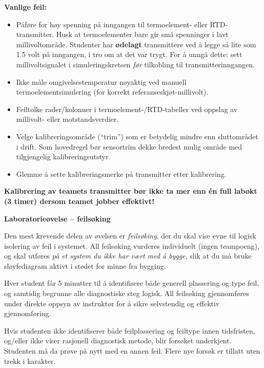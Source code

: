 \vskip 10pt

{\bf Vanlige feil:}

\begin{itemize}
\item{} Påføre for høy spenning på inngangen til termoelement- eller RTD-transmitter. Husk at termoelementer bare gir små spenninger i lavt millivoltområde. Studenter har {\bf ødelagt} transmittere ved å legge så lite som 1.5 volt på inngangen, i tro om at det var trygt. For å unngå dette: sett millivoltsignalet i simuleringskretsen {\it før} tilkobling til transmitterinngangen.
\item{} Ikke måle omgivelsestemperatur nøyaktig ved manuell termoelementsimulering (for korrekt referanseskjøt-millivolt).
\item{} Feiltolke rader/kolonner i termoelement-/RTD-tabeller ved oppslag av millivolt- eller motstandsverdier.
\item{} Velge kalibreringsområde (``trim'') som er betydelig mindre enn sluttområdet i drift. Som hovedregel bør sensortrim dekke bredest mulig område med tilgjengelig kalibreringsutstyr.
\item{} Glemme å sette kalibreringsmerke på transmitter etter kalibrering.
\end{itemize}

\vskip 10pt

{\bf Kalibrering av teamets transmitter bør ikke ta mer enn én full labøkt (3 timer) dersom teamet jobber effektivt!}



\vfil \eject

\noindent
{\bf Laboratorieøvelse -- feilsøking}

\vskip 5pt

Den mest krevende delen av øvelsen er {\it feilsøking}, der du skal vise evne til logisk isolering av feil i systemet. All feilsøking vurderes individuelt (ingen teampoeng), og skal utføres {\it på et system du ikke har vært med å bygge}, slik at du må bruke sløyfediagram aktivt i stedet for minne fra bygging.

Hver student får 5 minutter til å identifisere både generell plassering og type feil, og samtidig begrunne alle diagnostiske steg logisk. All feilsøking gjennomføres under direkte oppsyn av instruktør for å sikre selvstendig og effektiv gjennomføring.

Hvis studenten ikke identifiserer både feilplassering og feiltype innen tidsfristen, og/eller ikke viser rasjonell diagnostisk metode, blir forsøket underkjent. Studenten må da prøve på nytt med en annen feil. Flere nye forsøk er tillatt uten trekk i karakter.

